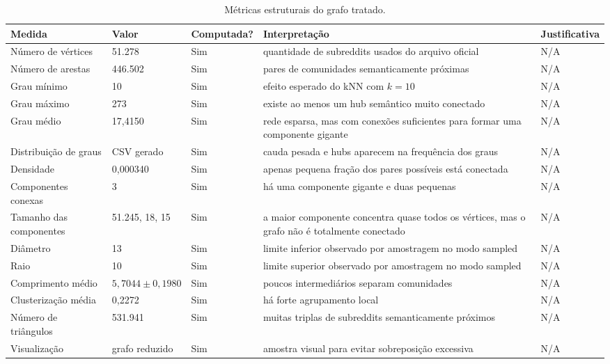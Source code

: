 \documentclass[sigconf]{webmedia}
\begin{document}
\begin{table}
  \caption{Métricas estruturais do grafo tratado.}
  \label{tab:estrutural}
  \begin{tabular}{@{}p{}p{}p{}p{}p{}@{}}
    \toprule
    Medida & Valor & Computada? & Interpretação & Justificativa \\
    \midrule
    Número de vértices & 51.278 & Sim & quantidade de subreddits usados do arquivo oficial & N/A \\
    Número de arestas & 446.502 & Sim & pares de comunidades semanticamente próximas & N/A \\
    Grau mínimo & 10 & Sim & efeito esperado do kNN com $k=10$ & N/A \\
    Grau máximo & 273 & Sim & existe ao menos um hub semântico muito conectado & N/A \\
    Grau médio & 17,4150 & Sim & rede esparsa, mas com conexões suficientes para formar uma componente gigante & N/A \\
    Distribuição de graus & CSV gerado & Sim & cauda pesada e hubs aparecem na frequência dos graus & N/A \\
    Densidade & 0,000340 & Sim & apenas pequena fração dos pares possíveis está conectada & N/A \\
    Componentes conexas & 3 & Sim & há uma componente gigante e duas pequenas & N/A \\
    Tamanho das componentes & 51.245, 18, 15 & Sim & a maior componente concentra quase todos os vértices, mas o grafo não é totalmente conectado & N/A \\
    Diâmetro & 13 & Sim & limite inferior observado por amostragem no modo sampled & N/A \\
    Raio & 10 & Sim & limite superior observado por amostragem no modo sampled & N/A \\
    Comprimento médio & $5,7044 \pm 0,1980$ & Sim & poucos intermediários separam comunidades & N/A \\
    Clusterização média & 0,2272 & Sim & há forte agrupamento local & N/A \\
    Número de triângulos & 531.941 & Sim & muitas triplas de subreddits semanticamente próximos & N/A \\
    Visualização & grafo reduzido & Sim & amostra visual para evitar sobreposição excessiva & N/A \\
    \bottomrule
  \end{tabular}
\end{table}
\end{document}
